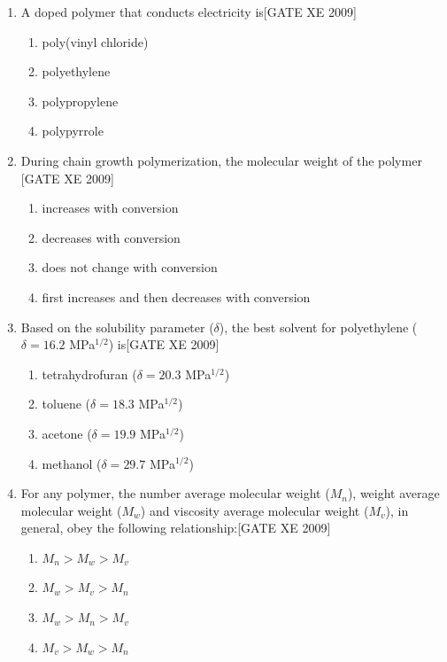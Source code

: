 \documentclass[journal,12pt,onecolumn]{IEEEtran}
\theoremstyle{remark}
\begin{document}
\begin{enumerate}[label=\textbf{Q.\arabic*.},  wide=0pt, leftmargin=*]
    \item A doped polymer that conducts electricity is\hfill[GATE XE 2009]
    \begin{multicols}{2}
    \begin{enumerate}
        \item poly(vinyl chloride) 
        \item polyethylene 
        \item polypropylene 
        \item polypyrrole
    \end{enumerate}
    \end{multicols}

   \item During chain growth polymerization, the molecular weight of the polymer
    \hfill[GATE XE 2009]
   \begin{multicols}{2}
    \begin{enumerate}
        \item increases with conversion 
        \item decreases with conversion 
        \item does not change with conversion 
        \item first increases and then decreases with conversion
    \end{enumerate}
    \end{multicols}

   \item  Based on the solubility parameter ($\delta$), the best solvent for polyethylene ($\delta = 16.2$ MPa$^{1/2}$) is\hfill[GATE XE 2009]
   \begin{multicols}{2}
    \begin{enumerate}
        \item tetrahydrofuran ($\delta = 20.3$ MPa$^{1/2}$) 
        \item toluene ($\delta = 18.3$ MPa$^{1/2}$) 
        \item acetone ($\delta = 19.9$ MPa$^{1/2}$)
        \item methanol ($\delta = 29.7$ MPa$^{1/2}$)\
    \end{enumerate}
    \end{multicols}

    \item  For any polymer, the number average molecular weight ($M_n$), weight average molecular weight ($M_w$) and viscosity average molecular weight ($M_v$), in general, obey the following relationship:\hfill[GATE XE 2009]
    \begin{multicols}{2}
    \begin{enumerate}
        \item $M_n > M_w > M_v$ 
        \item $M_w > M_v > M_n$ 
        \item $M_w > M_n > M_v$ 
        \item $M_v > M_w > M_n$
\end{enumerate}
\end{multicols}


\end{enumerate}
\end{document}
